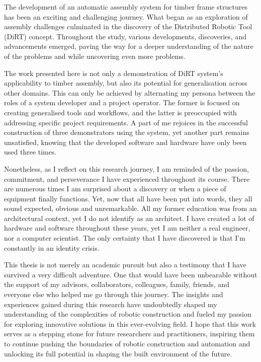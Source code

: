 The development of an automatic assembly system for timber frame structures has been an exciting and challenging journey. What began as an exploration of assembly challenges culminated in the discovery of the Distributed Robotic Tool (DiRT) concept. Throughout the study, various developments, discoveries, and advancements emerged, paving the way for a deeper understanding of the nature of the problems and while uncovering even more problems.

The work presented here is not only a demonstration of DiRT system's applicability to timber assembly, but also its potential for generalisation across other domains. This can only be achieved by alternating my persona between the roles of a system developer and a project operator. The former is focused on creating generalised tools and workflows, and the latter is preoccupied with addressing specific project requirements. A part of me rejoices in the successful construction of three demonstrators using the system, yet another part remains unsatisfied, knowing that the developed software and hardware have only been used three times.

Nonetheless, as I reflect on this research journey, I am reminded of the passion, commitment, and perseverance I have experienced throughout its course. There are numerous times I am surprised about a discovery or when a piece of equipment finally functions. Yet, now that all have been put into words, they all sound expected, obvious and unremarkable. All my former education was from an architectural context, yet I do not identify as an architect. I have created a lot of hardware and software throughout these years, yet I am neither a real engineer, nor a computer scientist. The only certainty that I have discovered is that I’m constantly in an identity crisis. 

This thesis is not merely an academic pursuit but also a testimony that I have survived a very difficult adventure. One that would have been unbearable without the support of my advisors, collaborators, colleagues, family, friends, and everyone else who helped me go through this journey. The insights and experiences gained during this research have undoubtedly shaped my understanding of the complexities of robotic construction and fueled my passion for exploring innovative solutions in this ever-evolving field. I hope that this work serves as a stepping stone for future researchers and practitioners, inspiring them to continue pushing the boundaries of robotic construction and automation and unlocking its full potential in shaping the built environment of the future. 


